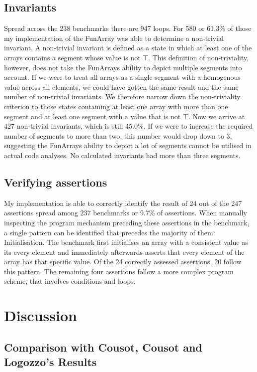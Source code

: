 \documentclass{report}
\begin{document}
\subsection{Invariants}
Spread across the 238 benchmarks there are 947 loops. For 580 or 61.3\% of those my implementation of the FunArray was able to determine a non-trivial invariant. A non-trivial invariant is defined as a state in which at least one of the arrays contains a segment whose value is not $\top$.
This definition of non-triviality, however, does not take the FunArrays ability to depict multiple segments into account. If we were to treat all arrays as a single segment with a homogenous value across all elements, we could have gotten the same result and the same number of non-trivial invariants. We therefore narrow down the non-triviality criterion to those states containing at least one array with more than one segment and at least one segment with a value that is not $\top$. Now we arrive at 427 non-trivial invariants, which is still 45.0\%. 
If we were to increase the required number of segments to more than two, this number would drop down to 3, suggesting the FunArrays ability to depict a lot of segments cannot be utilised in actual code analyses. No calculated invariants had more than three segments.

\subsection{Verifying assertions}

My implementation is able to correctly identify the result of 24 out of the 247 assertions spread among 237 benchmarks or 9.7\% of assertions. When manually inspecting the program mechanism preceding these assertions in the benchmark, a single pattern can be identified that precedes the majority of them: Initialisation. The benchmark first initialises an array with a consistent value as its every element and immediately afterwards asserts that every element of the array has that specific value. Of the 24 correctly assessed assertions, 20 follow this pattern. The remaining four assertions follow a more complex program scheme, that involves conditions and loops.



\section{Discussion}
\subsection{Comparison with Cousot, Cousot and Logozzo's Results}
\end{document}
